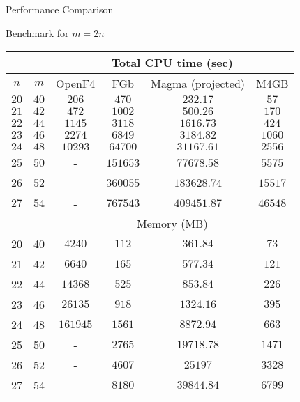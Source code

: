 \documentclass{beamer}
\begin{document}
\begin{section}{Performance Comparison}
  \begin{frame}{Benchmark for $m = 2n$}
    \vspace{-3mm}
    \begin{scriptsize}
      \begin{table}
        \begin{tabular}[h]{|c|c|c|c|c|c|}
          \hline
          \multicolumn{2}{|c|}{} &\multicolumn{4}{c|}{Total CPU time (sec)}\\
          \hline
          $n$ & $m$ & OpenF4 & FGb & Magma (projected) & M4GB \\
          \hline
          $20$ & $40$ & $206$     & $470$ &  $232.17$ & $57$                 \\
          $21$ & $42$ & $472$     & $1002$ & $500.26$ & $170$             \\
          $22$ & $44$ & $1145$   & $3118$ & $1616.73$ & $424$             \\
          $23$ & $46$ & $2274$   & $6849$ & $3184.82$ & $1060$           \\
          $24$ & $48$ & $10293$ & $64700$ & $31167.61$ & $2556$        \\
          $25$ & $50$ & -             & $151653$ & $77678.58$ & $5575$       \\
          $26$ & $52$ & -             & $360055$ & $183628.74$ & $15517$     \\
          $27$ & $54$ & -             & $767543$ & $409451.87$ & $46548$     \\
          \hline\hline
          \multicolumn{2}{|c|}{} & \multicolumn{4}{c|}{Memory (MB)} \\
          \hline
          20 & 40 & $4240$     & $112$  & $361.84$ & $73$\\
          21 & 42 & $6640$     & $165$      & $577.34$ & $121$\\
          22 & 44 & $14368$   & $525$    & $853.84$ & $226$\\
          23 & 46 & $26135$   & $918$    & $1324.16$ & $395$\\
          24 & 48  & $161945$ & $1561$  & $8872.94$ & $663$\\
          25 & 50 & -               & $2765$    & $19718.78$ & $1471$\\
          26 & 52 & -               & $4607$   & $25197$ & $3328$\\
          27 & 54 & -               & $8180$   & $39844.84$ & $6799$\\
          \hline
        

\end{tabular}
\end{table}
\end{scriptsize}
\end{frame}
\end{section}
\end{document}
